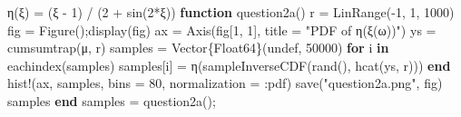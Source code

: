 \documentclass[
]{article}
\newenvironment{Shaded}{\begin{snugshade}}{\end{snugshade}}
\newcommand{\ConstantTok}[1]{\textcolor[rgb]{0.56,0.35,0.01}{#1}}
\newcommand{\ControlFlowTok}[1]{\textcolor[rgb]{0.00,0.23,0.31}{\textbf{#1}}}
\newcommand{\DataTypeTok}[1]{\textcolor[rgb]{0.68,0.00,0.00}{#1}}
\newcommand{\FloatTok}[1]{\textcolor[rgb]{0.68,0.00,0.00}{#1}}
\newcommand{\FunctionTok}[1]{\textcolor[rgb]{0.28,0.35,0.67}{#1}}
\newcommand{\KeywordTok}[1]{\textcolor[rgb]{0.00,0.23,0.31}{\textbf{#1}}}
\newcommand{\NormalTok}[1]{\textcolor[rgb]{0.00,0.23,0.31}{#1}}
\newcommand{\OperatorTok}[1]{\textcolor[rgb]{0.37,0.37,0.37}{#1}}
\newcommand{\StringTok}[1]{\textcolor[rgb]{0.13,0.47,0.30}{#1}}
\begin{document}
\begin{Shaded}
\begin{Highlighting}[]
\FunctionTok{η}\NormalTok{(ξ) }\OperatorTok{=}\NormalTok{ (ξ }\OperatorTok{{-}} \FloatTok{1}\NormalTok{) }\OperatorTok{/}\NormalTok{ (}\FloatTok{2} \OperatorTok{+} \FunctionTok{sin}\NormalTok{(}\FloatTok{2}\OperatorTok{*}\NormalTok{ξ))}
\KeywordTok{function} \FunctionTok{question2a}\NormalTok{()}
\NormalTok{    r }\OperatorTok{=} \FunctionTok{LinRange}\NormalTok{(}\OperatorTok{{-}}\FloatTok{1}\NormalTok{, }\FloatTok{1}\NormalTok{, }\FloatTok{1000}\NormalTok{)}
\NormalTok{    fig }\OperatorTok{=} \FunctionTok{Figure}\NormalTok{();}\FunctionTok{display}\NormalTok{(fig)}
\NormalTok{    ax }\OperatorTok{=} \FunctionTok{Axis}\NormalTok{(fig[}\FloatTok{1}\NormalTok{, }\FloatTok{1}\NormalTok{],}
\NormalTok{        title }\OperatorTok{=} \StringTok{"PDF of η(ξ(ω))"}\NormalTok{)}
\NormalTok{    ys }\OperatorTok{=} \FunctionTok{cumsumtrap}\NormalTok{(μ, r)}
\NormalTok{    samples }\OperatorTok{=} \FunctionTok{Vector}\DataTypeTok{\{Float64\}}\NormalTok{(}\ConstantTok{undef}\NormalTok{, }\FloatTok{50000}\NormalTok{)}
    \ControlFlowTok{for}\NormalTok{ i }\KeywordTok{in} \FunctionTok{eachindex}\NormalTok{(samples)}
\NormalTok{        samples[i] }\OperatorTok{=} \FunctionTok{η}\NormalTok{(}\FunctionTok{sampleInverseCDF}\NormalTok{(}\FunctionTok{rand}\NormalTok{(), }\FunctionTok{hcat}\NormalTok{(ys, r)))}
    \ControlFlowTok{end}
    \FunctionTok{hist!}\NormalTok{(ax, samples, bins }\OperatorTok{=} \FloatTok{80}\NormalTok{, normalization }\OperatorTok{=} \OperatorTok{:}\NormalTok{pdf)}
    \FunctionTok{save}\NormalTok{(}\StringTok{"question2a.png"}\NormalTok{, fig)}
\NormalTok{    samples}
\KeywordTok{end}
\NormalTok{samples }\OperatorTok{=} \FunctionTok{question2a}\NormalTok{();}
\end{Highlighting}
\end{Shaded}

\begin{figure}


\caption{\label{fig-q2pa}}

\end{figure}%
\end{document}

